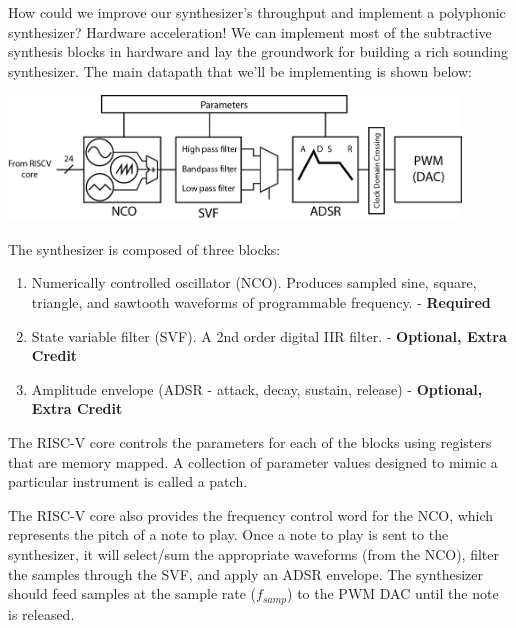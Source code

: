 \documentclass[11pt]{article}
\begin{document}
How could we improve our synthesizer's throughput and implement a polyphonic synthesizer?
Hardware acceleration!
We can implement most of the subtractive synthesis blocks in hardware and lay the groundwork for building a rich sounding synthesizer.
The main datapath that we'll be implementing is shown below:

\begin{center}
  \includegraphics[width=0.9\textwidth]{images/ss_dp_1.png}
\end{center}

The synthesizer is composed of three blocks:
\begin{enumerate}
  \item Numerically controlled oscillator (NCO). Produces sampled sine, square, triangle, and sawtooth waveforms of programmable frequency. - \textbf{Required}
  \item State variable filter (SVF). A 2nd order digital IIR filter. - \textbf{Optional, Extra Credit}
  \item Amplitude envelope (ADSR - attack, decay, sustain, release) - \textbf{Optional, Extra Credit}
\end{enumerate}

The RISC-V core controls the parameters for each of the blocks using registers that are memory mapped.
A collection of parameter values designed to mimic a particular instrument is called a patch.

The RISC-V core also provides the frequency control word for the NCO, which represents the pitch of a note to play.
Once a note to play is sent to the synthesizer, it will select/sum the appropriate waveforms (from the NCO), filter the samples through the SVF, and apply an ADSR envelope.
The synthesizer should feed samples at the sample rate ($f_{samp}$) to the PWM DAC until the note is released.
\end{document}
